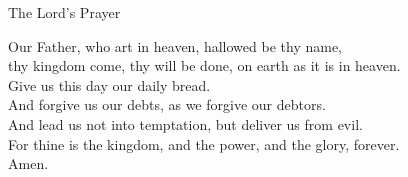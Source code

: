 The Lord's Prayer\\
\vspace{.4em}
\begin{leftbar}
Our Father, who art in heaven, hallowed be thy name,\\
thy kingdom come, thy will be done, on earth as it is in heaven.\\
Give us this day our daily bread.\\
And forgive us our debts, as we forgive our debtors.\\
And lead us not into temptation, but deliver us from evil.\\
For thine is the kingdom, and the power, and the glory, forever. \\
Amen.
\end{leftbar}

\vspace{-1em}
